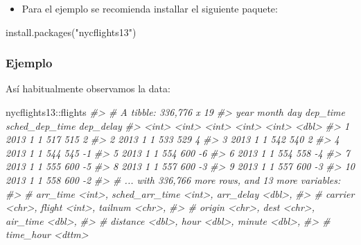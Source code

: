 \documentclass[
]{book}
\newenvironment{Shaded}{\begin{snugshade}}{\end{snugshade}}
\newcommand{\CommentTok}[1]{\textcolor[rgb]{0.56,0.35,0.01}{\textit{#1}}}
\newcommand{\FunctionTok}[1]{\textcolor[rgb]{0.00,0.00,0.00}{#1}}
\newcommand{\NormalTok}[1]{#1}
\newcommand{\SpecialCharTok}[1]{\textcolor[rgb]{0.00,0.00,0.00}{#1}}
\newcommand{\StringTok}[1]{\textcolor[rgb]{0.31,0.60,0.02}{#1}}
\providecommand{\tightlist}{%
  \setlength{\itemsep}{0pt}\setlength{\parskip}{0pt}}
\begin{document}
\begin{itemize}
\tightlist
\item
  Para el ejemplo se recomienda installar el siguiente paquete:
\end{itemize}

\begin{Shaded}
\begin{Highlighting}[]
\FunctionTok{install.packages}\NormalTok{(}\StringTok{"nycflights13"}\NormalTok{)}
\end{Highlighting}
\end{Shaded}

\hypertarget{ejemplo}{%
\subsubsection{Ejemplo}\label{ejemplo}}

Así habitualmente observamos la data:

\begin{Shaded}
\begin{Highlighting}[]
\NormalTok{nycflights13}\SpecialCharTok{::}\NormalTok{flights}
\CommentTok{\#\textgreater{} \# A tibble: 336,776 x 19}
\CommentTok{\#\textgreater{}     year month   day dep\_time sched\_dep\_time dep\_delay}
\CommentTok{\#\textgreater{}    \textless{}int\textgreater{} \textless{}int\textgreater{} \textless{}int\textgreater{}    \textless{}int\textgreater{}          \textless{}int\textgreater{}     \textless{}dbl\textgreater{}}
\CommentTok{\#\textgreater{}  1  2013     1     1      517            515         2}
\CommentTok{\#\textgreater{}  2  2013     1     1      533            529         4}
\CommentTok{\#\textgreater{}  3  2013     1     1      542            540         2}
\CommentTok{\#\textgreater{}  4  2013     1     1      544            545        {-}1}
\CommentTok{\#\textgreater{}  5  2013     1     1      554            600        {-}6}
\CommentTok{\#\textgreater{}  6  2013     1     1      554            558        {-}4}
\CommentTok{\#\textgreater{}  7  2013     1     1      555            600        {-}5}
\CommentTok{\#\textgreater{}  8  2013     1     1      557            600        {-}3}
\CommentTok{\#\textgreater{}  9  2013     1     1      557            600        {-}3}
\CommentTok{\#\textgreater{} 10  2013     1     1      558            600        {-}2}
\CommentTok{\#\textgreater{} \# ... with 336,766 more rows, and 13 more variables:}
\CommentTok{\#\textgreater{} \#   arr\_time \textless{}int\textgreater{}, sched\_arr\_time \textless{}int\textgreater{}, arr\_delay \textless{}dbl\textgreater{},}
\CommentTok{\#\textgreater{} \#   carrier \textless{}chr\textgreater{}, flight \textless{}int\textgreater{}, tailnum \textless{}chr\textgreater{},}
\CommentTok{\#\textgreater{} \#   origin \textless{}chr\textgreater{}, dest \textless{}chr\textgreater{}, air\_time \textless{}dbl\textgreater{},}
\CommentTok{\#\textgreater{} \#   distance \textless{}dbl\textgreater{}, hour \textless{}dbl\textgreater{}, minute \textless{}dbl\textgreater{},}
\CommentTok{\#\textgreater{} \#   time\_hour \textless{}dttm\textgreater{}}
\end{Highlighting}
\end{Shaded}
\end{document}
